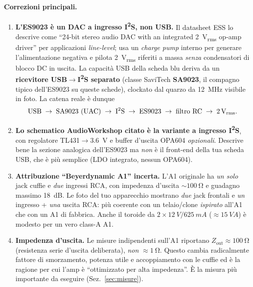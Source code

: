 \paragraph{Correzioni principali.}
\begin{enumerate}
  \item \textbf{L'ES9023 è un DAC a ingresso I\textsuperscript{2}S, non
        USB.} Il datasheet ESS lo descrive come ``24-bit stereo audio
        DAC with an integrated \SI{2}{V_{rms}} op-amp driver'' per
        applicazioni \emph{line-level}; usa un \emph{charge pump}
        interno per generare l'alimentazione negativa e pilota
        \SI{2}{V_{rms}} riferiti a massa \emph{senza} condensatori di
        blocco DC in uscita. La capacità USB della scheda blu deriva da
        un \textbf{ricevitore USB$\rightarrow$I\textsuperscript{2}S
        separato} (classe SaviTech \textbf{SA9023}, il compagno tipico
        dell'ES9023 su queste schede), clockato dal quarzo da
        \SI{12}{MHz} visibile in foto. La catena reale è dunque
        \[
        \text{USB} \;\rightarrow\; \text{SA9023 (UAC)} \;\rightarrow\;
        \text{I\textsuperscript{2}S} \;\rightarrow\; \text{ES9023}
        \;\rightarrow\; \text{filtro RC} \;\rightarrow\; \SI{2}{V_{rms}}.
        \]
  \item \textbf{Lo schematico AudioWorkshop citato è la variante a
        ingresso I\textsuperscript{2}S}, con regolatore TL431$\to$\SI{3.6}{V}
        e buffer d'uscita OPA604 \emph{opzionali}. Descrive bene la
        sezione analogica dell'ES9023 ma \emph{non} è il front-end della
        tua scheda USB, che è più semplice (LDO integrato, nessun OPA604).
  \item \textbf{Attribuzione ``Beyerdynamic A1'' incerta.} L'A1 originale
        ha \emph{un solo} jack cuffie e \emph{due} ingressi RCA, con
        impedenza d'uscita $\sim\SI{100}{\ohm}$ e guadagno massimo
        \SI{18}{dB}. Le foto del tuo apparecchio mostrano \emph{due}
        jack frontali e \emph{un} ingresso + \emph{una} uscita RCA: più
        coerente con un telaio/clone \emph{ispirato} all'A1 che con un A1
        di fabbrica. Anche il toroide da $2\times\SI{12}{V}/\SI{625}{mA}$
        ($\approx\SI{15}{VA}$) è modesto per un vero class-A A1.
  \item \textbf{Impedenza d'uscita.} Le misure indipendenti sull'A1
        riportano $Z_{\text{out}}\approx\SI{100}{\ohm}$ (resistenza serie
        d'uscita deliberata), \emph{non} $\approx\SI{1}{\ohm}$. Questo
        cambia radicalmente fattore di smorzamento, potenza utile e
        accoppiamento con le cuffie ed è la ragione per cui l'amp è
        ``ottimizzato per alta impedenza''. È la misura più importante da
        eseguire (Sez.~\ref{sec:misure}).
\end{enumerate}

